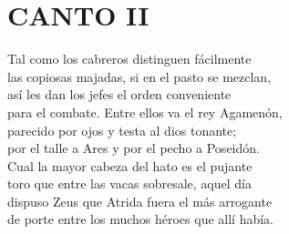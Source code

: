\bnum
\section*{\centering\textbf{CANTO II}}
%
\separator
%
\postart
{}Tal como los cabreros distinguen fácilmente\\
las copiosas majadas, si en el pasto se mezclan,\\
así les dan los jefes el orden conveniente\\
para el combate. Entre ellos va el rey Agamenón,\\
parecido por ojos y testa al dios tonante;\\
por el talle a Ares y por el pecho a Poseidón.\\
Cual la mayor cabeza del hato es el pujante\\
toro que entre las vacas sobresale, aquel día\\
dispuso Zeus que Atrida fuera el más arrogante\\
de porte entre los muchos héroes que allí había.\par
\poend
\enum
%
\separator